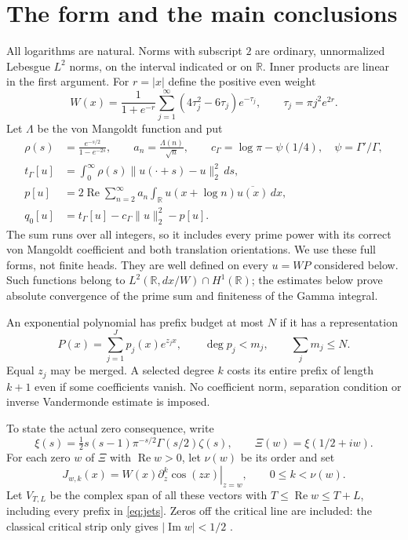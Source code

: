 \documentclass[11pt]{article}
\theoremstyle{remark}
\newcommand{\R}{\mathbb R}
\newcommand{\norm}[1]{\lVert #1\rVert}
\newcommand{\Rea}{\operatorname{Re}}
\newcommand{\Ima}{\operatorname{Im}}
\newcommand{\tg}{t_\Gamma}
\newcommand{\cg}{c_\Gamma}
\begin{document}
\section{The form and the main conclusions}
All logarithms are natural. Norms with subscript $2$ are ordinary,
unnormalized Lebesgue $L^2$ norms, on the interval indicated or on $\R$.
Inner products are linear in the first argument.
For $r=|x|$ define the positive even weight
\begin{equation}\label{eq:weight}
 W(x)=\frac{1}{1+e^{-r}}
 \sum_{j=1}^{\infty}(4\tau_j^2-6\tau_j)e^{-\tau_j},
 \qquad \tau_j=\pi j^2e^{2r}.
\end{equation}
Let $\Lambda$ be the von Mangoldt function and put
\begin{equation}\label{eq:forms}
\begin{split}
 \rho(s)&=\frac{e^{-s/2}}{1-e^{-2s}},\qquad
 a_n=\frac{\Lambda(n)}{\sqrt n},\qquad
 \cg=\log\pi-\psi(1/4),\quad \psi=\Gamma'/\Gamma,\\
 \tg[u]&=\int_0^\infty\rho(s)
               \norm{u(\cdot+s)-u}_2^2\,ds,\\
 p[u]&=2\Rea\sum_{n=2}^{\infty}a_n
                  \int_\R u(x+\log n)\overline{u(x)}\,dx,\\
 q_0[u]&=\tg[u]-\cg\norm u_2^2-p[u].
\end{split}
\end{equation}
The sum runs over all integers, so it includes every prime power with its
correct von Mangoldt coefficient and both translation orientations.
We use these full forms, not finite heads. They are well defined on every
$u=WP$ considered below. Such functions belong to
$L^2(\R,dx/W)\cap H^1(\R)$; the estimates below prove absolute convergence
of the prime sum and finiteness of the Gamma integral.

An exponential polynomial has prefix budget at most $N$ if it has a
representation
\begin{equation}\label{eq:prefix}
 P(x)=\sum_{j=1}^{J}p_j(x)e^{z_jx},\qquad
 \deg p_j<m_j,\qquad \sum_jm_j\le N.
\end{equation}
Equal $z_j$ may be merged. A selected degree $k$ costs its entire prefix
of length $k+1$ even if some coefficients vanish. No coefficient norm,
separation condition or inverse Vandermonde estimate is imposed.

To state the actual zero consequence, write
\[
 \xi(s)=\tfrac12s(s-1)\pi^{-s/2}\Gamma(s/2)\zeta(s),\qquad
 \Xi(w)=\xi(1/2+iw).
\]
For each zero $w$ of $\Xi$ with $\Rea w>0$, let $\nu(w)$ be its order and set
\begin{equation}\label{eq:jets}
 J_{w,k}(x)=W(x)\left.\partial_z^k\cos(zx)\right|_{z=w},
 \qquad 0\le k<\nu(w).
\end{equation}
Let $V_{T,L}$ be the complex span of all these vectors with
$T\le\Rea w\le T+L$, including every prefix in \eqref{eq:jets}.
Zeros off the critical line are included: the classical critical strip
only gives $|\Ima w|<1/2$ \cite[Sections 25.4 and 25.10]{DLMF}.
\end{document}
